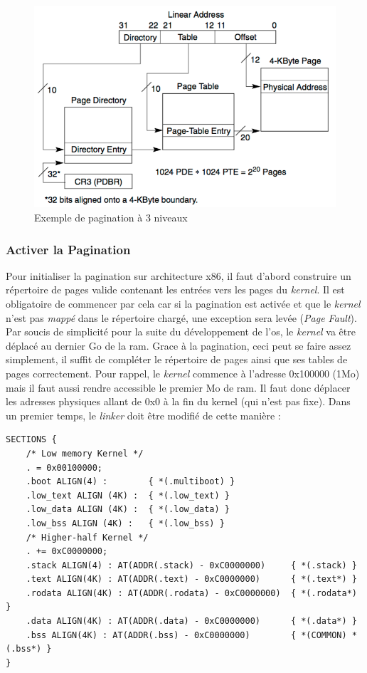 \documentclass[a4paper, 12pt]{article}
\begin{document}
\begin{figure}[!h]
  \centering
  \includegraphics[scale=0.85]{images/paging3.png}
  \caption{Exemple de pagination à 3 niveaux}
  \label{paging3}
\end{figure}

\subsubsection{Activer la Pagination}
Pour initialiser la pagination sur architecture x86, il faut d'abord construire
un répertoire de pages valide contenant les entrées vers les pages du \textit{kernel}.
Il est obligatoire de commencer par cela car si la pagination est activée et que
le \textit{kernel} n'est pas \textit{mappé} dans le répertoire chargé, une exception
sera levée (\textit{Page Fault}). Par soucis de simplicité pour la suite du développement
de l'\acrshort{os}, le \textit{kernel} va être déplacé au dernier Go de la \acrshort{ram}.
Grace à la pagination, ceci peut se faire assez simplement, il suffit de compléter
le répertoire de pages ainsi que ses tables de pages correctement. Pour rappel,
le \textit{kernel} commence à l'adresse 0x100000 (1Mo) mais il faut aussi rendre
accessible le premier Mo de \acrshort{ram}. Il faut donc déplacer les adresses physiques
allant de 0x0 à la fin du kernel (qui n'est pas fixe). Dans un premier temps, le
\textit{linker} doit être modifié de cette manière :

\begin{verbatim}
SECTIONS {
    /* Low memory Kernel */
    . = 0x00100000;
    .boot ALIGN(4) :        { *(.multiboot) }
    .low_text ALIGN (4K) :  { *(.low_text) }
    .low_data ALIGN (4K) :  { *(.low_data) }
    .low_bss ALIGN (4K) :   { *(.low_bss) }
    /* Higher-half Kernel */
    . += 0xC0000000;
    .stack ALIGN(4) : AT(ADDR(.stack) - 0xC0000000)     { *(.stack) }
    .text ALIGN(4K) : AT(ADDR(.text) - 0xC0000000)      { *(.text*) }
    .rodata ALIGN(4K) : AT(ADDR(.rodata) - 0xC0000000)  { *(.rodata*) }
    .data ALIGN(4K) : AT(ADDR(.data) - 0xC0000000)      { *(.data*) }
    .bss ALIGN(4K) : AT(ADDR(.bss) - 0xC0000000)        { *(COMMON) *(.bss*) }
}
\end{verbatim}
\end{document}
